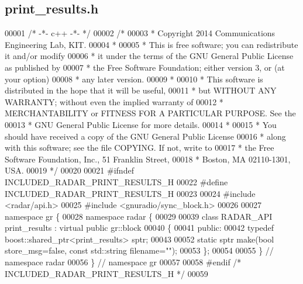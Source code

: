 \subsection{print\+\_\+results.\+h}
\label{print__results_8h_source}

\begin{DoxyCode}
00001 \textcolor{comment}{/* -*- c++ -*- */}
00002 \textcolor{comment}{/* }
00003 \textcolor{comment}{ * Copyright 2014 Communications Engineering Lab, KIT.}
00004 \textcolor{comment}{ * }
00005 \textcolor{comment}{ * This is free software; you can redistribute it and/or modify}
00006 \textcolor{comment}{ * it under the terms of the GNU General Public License as published by}
00007 \textcolor{comment}{ * the Free Software Foundation; either version 3, or (at your option)}
00008 \textcolor{comment}{ * any later version.}
00009 \textcolor{comment}{ * }
00010 \textcolor{comment}{ * This software is distributed in the hope that it will be useful,}
00011 \textcolor{comment}{ * but WITHOUT ANY WARRANTY; without even the implied warranty of}
00012 \textcolor{comment}{ * MERCHANTABILITY or FITNESS FOR A PARTICULAR PURPOSE.  See the}
00013 \textcolor{comment}{ * GNU General Public License for more details.}
00014 \textcolor{comment}{ * }
00015 \textcolor{comment}{ * You should have received a copy of the GNU General Public License}
00016 \textcolor{comment}{ * along with this software; see the file COPYING.  If not, write to}
00017 \textcolor{comment}{ * the Free Software Foundation, Inc., 51 Franklin Street,}
00018 \textcolor{comment}{ * Boston, MA 02110-1301, USA.}
00019 \textcolor{comment}{ */}
00020  
00021 \textcolor{preprocessor}{#ifndef INCLUDED\_RADAR\_PRINT\_RESULTS\_H}
00022 \textcolor{preprocessor}{#define INCLUDED\_RADAR\_PRINT\_RESULTS\_H}
00023 
00024 \textcolor{preprocessor}{#include <radar/api.h>}
00025 \textcolor{preprocessor}{#include <gnuradio/sync\_block.h>}
00026 
00027 \textcolor{keyword}{namespace }gr \{
00028   \textcolor{keyword}{namespace }radar \{
00029 
00039     \textcolor{keyword}{class }RADAR_API print_results : \textcolor{keyword}{virtual} \textcolor{keyword}{public} gr::block
00040     \{
00041      \textcolor{keyword}{public}:
00042       \textcolor{keyword}{typedef} boost::shared\_ptr<print\_results> sptr;
00043 
00052       \textcolor{keyword}{static} sptr make(\textcolor{keywordtype}{bool} store\_msg=\textcolor{keyword}{false}, \textcolor{keyword}{const} std::string filename=\textcolor{stringliteral}{""});
00053     \};
00054 
00055   \} \textcolor{comment}{// namespace radar}
00056 \} \textcolor{comment}{// namespace gr}
00057 
00058 \textcolor{preprocessor}{#endif }\textcolor{comment}{/* INCLUDED\_RADAR\_PRINT\_RESULTS\_H */}\textcolor{preprocessor}{}
00059 
\end{DoxyCode}
